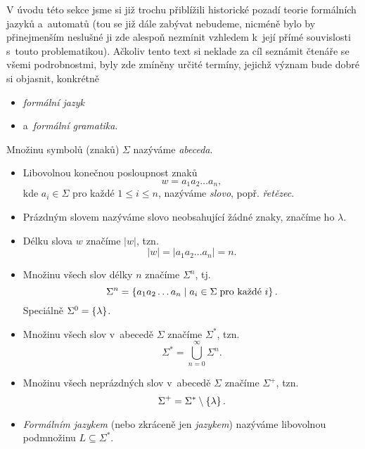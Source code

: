 V úvodu této sekce jsme si již trochu přiblížili historické pozadí teorie formálních jazyků a~automatů (tou se již dále zabývat nebudeme, nicméně bylo by přinejmenším neslušné ji zde alespoň nezmínit vzhledem k~její přímé souvislosti s~touto problematikou). Ačkoliv tento text si neklade za cíl seznámit čtenáře se všemi podrobnostmi, byly zde zmíněny určité termíny, jejichž význam bude dobré si objasnit, konkrétně
\begin{itemize}
    \item \emph{formální jazyk}
    \item a~\emph{formální gramatika}.
\end{itemize}
\begin{definition}\label{def:formalni-jazyk-etc}
    Množinu symbolů (znaků) $\Sigma$ nazýváme \emph{abeceda}.
    \begin{itemize}
        \item Libovolnou konečnou posloupnost znaků
        \[w=a_1a_2\ldots a_n,\]
        kde $a_i\in\Sigma$ pro každé $1\leqslant i\leqslant n$, nazýváme \emph{slovo}, popř. \emph{řetězec}.
        \item Prázdným slovem nazýváme slovo neobsahující žádné znaky, značíme ho $\lambda$.
        \item Délku slova $w$ značíme $|w|$, tzn.
        \[|w|=|a_1a_2\ldots a_n|=n.\]
        \item Množinu všech slov délky $n$ značíme $\Sigma^n$, tj.
        \[\Sigma^n=\left\{a_1a_2\ldots a_n\mid a_i\in\Sigma\;\text{pro každé $i$}\right\}.\]
        Speciálně $\Sigma^0=\left\{\lambda\right\}$.
        \item Množinu všech slov v~abecedě $\Sigma$ značíme $\Sigma^*$, tzn.
        \[\Sigma^*=\bigcup_{n=0}^\infty\Sigma^n.\]
        \item Množinu všech neprázdných slov v~abecedě $\Sigma$ značíme $\Sigma^+$, tzn.
        \[\Sigma^+=\Sigma^*\setminus\left\{\lambda\right\}.\]
        \item \emph{Formálním jazykem} (nebo zkráceně jen \emph{jazykem}) nazýváme libovolnou podmnožinu $L\subseteq\Sigma^*$.
    \end{itemize}
\end{definition}
